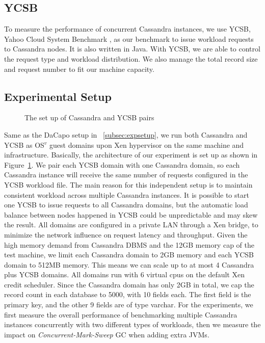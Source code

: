 \documentclass{sig-alternate}
\begin{document}
\subsection{YCSB}
To measure the performance of concurrent Cassandra instances, we use YCSB, Yahoo Cloud System Benchmark \cite{cooper2010benchmarking}, as our benchmark to issue workload requests to Cassandra nodes. It is also written in Java. With YCSB, we are able to control the request type and workload distribution. We also manage the total record size and request number to fit our machine capacity.

\subsection{Experimental Setup}
\begin{figure}
\centering
{}
\caption{The set up of Cassandra and YCSB pairs}
\label{fig:cassandrasetup}
\end{figure}
Same as the DaCapo setup in ~\ref{subsec:expsetup}, we run both Cassandra and YCSB as OS$^{v}$ guest domains upon Xen hypervisor on the same machine and infrastructure. Basically, the architecture of our experiment is set up as shown in Figure~\ref{fig:cassandrasetup}. We pair each YCSB domain with one Cassandra domain, so each Cassandra instance will receive the same number of requests configured in the YCSB workload file. The main reason for this independent setup is to maintain consistent workload across multiple Cassandra instances. It is possible to start one YCSB to issue requests to all Cassandra domains, but the automatic load balance between nodes happened in YCSB could be unpredictable and may skew the result. All domains are configured in a private LAN through a Xen bridge, to minimize the network influence on request latency and throughput. Given the high memory demand from Cassandra DBMS and the 12GB memory cap of the test machine, we limit each Cassandra domain to 2GB memory and each YCSB domain to 512MB memory. This means we can scale up to at most 4 Cassandra plus YCSB domains. All domains run with 6 virtual cpus on the default Xen credit scheduler. Since the Cassandra domain has only 2GB in total, we cap the record count in each database to 5000, with 10 fields each. The first field is the primary key, and the other 9 fields are of type varchar. For the experiments, we first measure the overall performance of benchmarking multiple Cassandra instances concurrently with two different types of workloads, then we measure the impact on \textit{Concurrent-Mark-Sweep} GC when adding extra JVMs.
\end{document}
